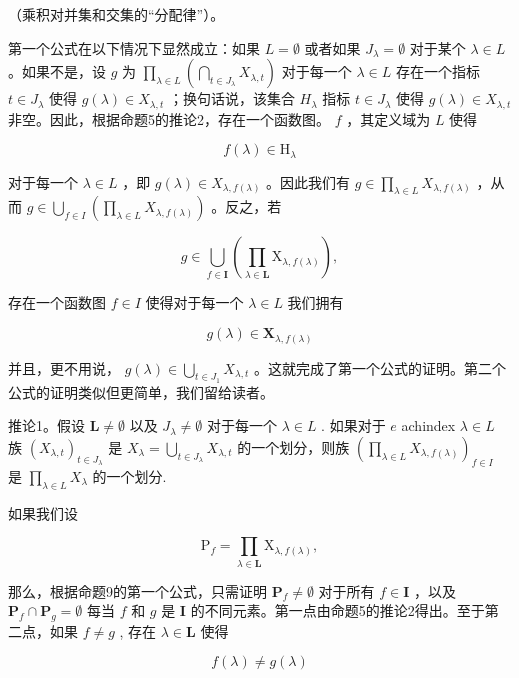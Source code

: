 （乘积对并集和交集的“分配律”）。

第一个公式在以下情况下显然成立：如果 \(L = \emptyset\) 或者如果 \(J_{\lambda} = \emptyset\) 对于某个 \(\lambda \in L\) 。如果不是，设 \(g\) 为 \(\prod_{\lambda \in L} \left( \bigcap_{t \in J_{\lambda}} X_{\lambda, t} \right)\) 对于每一个 \(\lambda \in L\) 存在一个指标 \(t \in J_{\lambda}\) 使得 \(g(\lambda) \in X_{\lambda, t}\) ；换句话说，该集合 \(H_{\lambda}\) 指标 \(t \in J_{\lambda}\) 使得 \(g(\lambda) \in X_{\lambda, t}\) 非空。因此，根据命题5的推论2，存在一个函数图。 \(f\) ，其定义域为 \(L\) 使得

\[
f (\lambda) \in \mathrm{H} _ {\lambda}
\]

对于每一个 \(\lambda \in L\) ，即 \(g(\lambda) \in X_{\lambda, f(\lambda)}\) 。因此我们有 \(g \in \prod_{\lambda \in L} X_{\lambda, f(\lambda)}\) ，从而 \(g \in \bigcup_{f \in I} \left( \prod_{\lambda \in L} X_{\lambda, f(\lambda)} \right)\) 。反之，若

\[
g \in \bigcup_ {f \in \mathbf {I}} \left(\prod_ {\lambda \in \mathbf {L}} \mathrm{X} _ {\lambda , f (\lambda)}\right),
\]

存在一个函数图 \(f \in I\) 使得对于每一个 \(\lambda \in L\) 我们拥有

\[
g (\lambda) \in \mathbf {X} _ {\lambda , f (\lambda)}
\]

并且，更不用说， \(g(\lambda) \in \bigcup_{t \in J_1} X_{\lambda,t}\) 。这就完成了第一个公式的证明。第二个公式的证明类似但更简单，我们留给读者。

推论1。假设 \(\mathbf{L} \neq \emptyset\) 以及 \(J_{\lambda} \neq \emptyset\) 对于每一个 \(\lambda \in L\) . 如果对于 \(e\) achindex \(\lambda \in L\) 族 \((X_{\lambda, t})_{t \in J_{\lambda}}\) 是 \(X_{\lambda} = \bigcup_{t \in J_{\lambda}} X_{\lambda, t}\) 的一个划分，则族 \(\left( \prod_{\lambda \in L} X_{\lambda, f(\lambda)} \right)_{f \in I}\) 是 \(\prod_{\lambda \in L} X_{\lambda}\) 的一个划分.

如果我们设

\[
\mathrm{P} _ {f} = \prod_ {\lambda \in \mathbf {L}} \mathrm{X} _ {\lambda , f (\lambda)},
\]

那么，根据命题9的第一个公式，只需证明 \(\mathbf{P}_f \neq \emptyset\) 对于所有 \(f \in \mathbf{I}\) ，以及 \(\mathbf{P}_f \cap \mathbf{P}_g = \emptyset\) 每当 \(f\) 和 \(g\) 是 \(\mathbf{I}\) 的不同元素。第一点由命题5的推论2得出。至于第二点，如果 \(f \neq g\) , 存在 \(\lambda \in \mathbf{L}\) 使得

\[
f (\lambda) \neq g (\lambda)
\]

